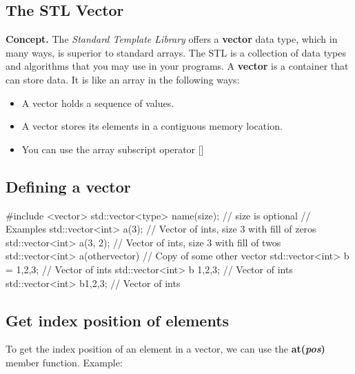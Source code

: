 \documentclass{report}
\begin{document}
    \pagebreak
    \subsection{The STL Vector}
    \bigbreak \noindent 
    \textbf{Concept. } The \textit{Standard Template Library} offers a \textbf{vector} data type, which in many ways, is superior to standard arrays.
    \bigbreak \noindent 
    The STL is a collection of data types and algorithms that you may use in your programs. 
    \bigbreak \noindent 
    A \textbf{vector} is a container that can store data. It is like an array in the following ways:
    \begin{itemize}
        \item A vector holds a sequence of values.
        \item A vector stores its elements in a contiguous memory location.
        \item You can use the array subscript operator []
    \end{itemize}

    \bigbreak \noindent 
    \subsection{Defining a vector}
    \bigbreak \noindent 
    
    \begin{cppcode}
#include <vector>
std::vector<type> name(size); // size is optional 
// Examples
std::vector<int> a(3); // Vector of ints, size 3 with fill of zeros
std::vector<int> a(3, 2); // Vector of ints, size 3 with fill of twos
std::vector<int> a(othervector) // Copy of some other vector
std::vector<int> b = {1,2,3}; // Vector of ints
std::vector<int> b {1,2,3}; // Vector of ints
std::vector<int> b{1,2,3}; // Vector of ints
    \end{cppcode}
    
    \bigbreak \noindent 

    \bigbreak \noindent 
    \subsection{Get index position of elements}
    \bigbreak \noindent 
    To get the index position of an element in a vector, we can use the \textbf{at(\textit{pos})} member function.
    \bigbreak \noindent 
    Example:
    \bigbreak \noindent 
    
\end{document}
